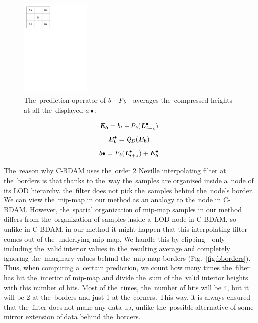 \begin{figure}
	\includegraphics[trim={0 21cm 10cm 0}, clip, width=0.3\textwidth]{figures/bcomp.pdf}\centering
	\caption{The~prediction operator of $b$ - $\mathit{P_{b}}$ - averages the~compressed heights at all the~displayed $a\bullet$.}
	\label{fig:bcomp}
\end{figure}

$$\objnorm{E}{b} = b_t - \opnorm{P}{b}(\ldot{i+1})$$
$$\objdot{E}{b} = \opnorm{Q}{D}(\objnorm{E}{b})$$
\begin{equation}
\label{eq:b}
b\bullet = \opnorm{P}{b}(\ldot{i+1}) + \objdot{E}{b}
\end{equation}

The~reason why C-BDAM uses the~order 2 Neville interpolating filter at the~borders is that thanks to the~way the~samples are organized inside a~node of its LOD hierarchy, the~filter does not pick the~samples behind the~node's border. We can view the~mip-map in our method as an analogy to the~node in C-BDAM. However, the~spatial organization of mip-map samples in our method differs from the~organization of samples inside a~LOD node in C-BDAM, so unlike in C-BDAM, in our method it might happen that this interpolating filter comes out of the~underlying mip-map. We handle this by clipping - only including the~valid interior values in the~resulting average and completely ignoring the~imaginary values behind the~mip-map borders (Fig.~\ref{fig:bborders}). Thus, when computing a~certain prediction, we count how many times the~filter has hit the~interior of mip-map and divide the~sum of the~valid interior heights with this number of hits. Most of the~times, the~number of hits will be 4, but it will be 2 at the~borders and just 1 at the~corners. This way, it is always ensured that the~filter does not make any data up, unlike the~possible alternative of some mirror extension of data behind the~borders.

